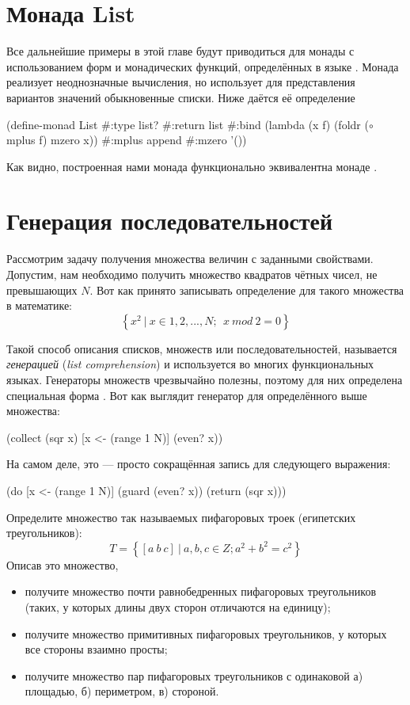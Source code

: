 \section[2]{Монада List}%
Все дальнейшие примеры в этой главе будут приводиться для монады  с использованием форм и монадических функций, определённых в языке \Scheme. Монада  реализует неоднозначные вычисления, но использует для представления вариантов значений обыкновенные списки. Ниже даётся её определение  

\begin{SchemeCode}
(define-monad List
  #:type list?
  #:return list
  #:bind (lambda (x f) (foldr ($\circ$ mplus f) mzero x))
  #:mplus append
  #:mzero '())
\end{SchemeCode}

Как видно, построенная нами монада  функционально эквивалентна монаде .

\section{Генерация последовательностей}%
Рассмотрим задачу получения множества величин с заданными свойствами. Допустим, нам необходимо получить множество квадратов чётных чисел, не превышающих $N$.  Вот как принято записывать определение для такого множества в математике:  $$\left\{ x^2~|~x \in {1, 2, ..., N};~~ x~mod~2 = 0 \right\}$$

Такой способ описания списков, множеств или последовательностей, называется \emph{генерацией} (\emph{list comprehension}) и используется во многих функциональных языках. Генераторы множеств чрезвычайно полезны, поэтому для них определена специальная форма .
Вот как выглядит генератор для определённого выше множества:
\begin{SchemeCode}[emph={x,N}]
  (collect (sqr x) [x <- (range 1 N)] (even? x))
\end{SchemeCode}
\noindent
На самом деле, это --- просто сокращённая запись для следующего выражения:
\begin{SchemeCode}[emph={x,N}]
  (do [x <- (range 1 N)]
      (guard (even? x))
      (return (sqr x)))
\end{SchemeCode}

\begin{Assignment}
Определите множество так называемых пифагоровых троек (египетских треугольников):
$$T = \left\{ [a~b~c]~|~a,b,c \in Z; a^2 + b^2 = c^2 \right\}$$
Описав это множество,
\begin{itemize}
  \item получите множество почти равнобедренных пифагоровых треугольников (таких, у которых длины двух сторон отличаются на единицу);
  \item получите множество примитивных пифагоровых треугольников, у которых все стороны взаимно просты;
  \item получите множество пар пифагоровых треугольников с одинаковой а) площадью, б) периметром, в) стороной.
\end{itemize}
\end{Assignment}


